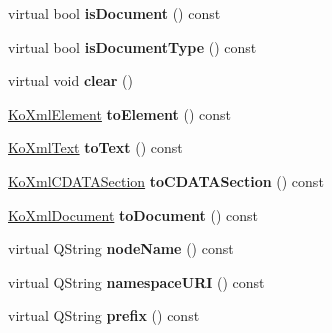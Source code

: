 \begin{CompactItemize}
\item 
\hypertarget{classKoXmlNode_72089a94f37917bdc8896368c83c75dd}{
virtual bool \textbf{isDocument} () const }
\label{classKoXmlNode_72089a94f37917bdc8896368c83c75dd}

\item 
\hypertarget{classKoXmlNode_c959bde05fba69bc9593e45e8862e7fd}{
virtual bool \textbf{isDocumentType} () const }
\label{classKoXmlNode_c959bde05fba69bc9593e45e8862e7fd}

\item 
\hypertarget{classKoXmlNode_514c6e4cca00c3cdd15b49b7256ccdca}{
virtual void \textbf{clear} ()}
\label{classKoXmlNode_514c6e4cca00c3cdd15b49b7256ccdca}

\item 
\hypertarget{classKoXmlNode_f4ecc91ee34dc96cce56baf014f33618}{
\hyperlink{classKoXmlElement}{KoXmlElement} \textbf{toElement} () const }
\label{classKoXmlNode_f4ecc91ee34dc96cce56baf014f33618}

\item 
\hypertarget{classKoXmlNode_0a59d93ef6d9470fd45eb4b9e9c36ef1}{
\hyperlink{classKoXmlText}{KoXmlText} \textbf{toText} () const }
\label{classKoXmlNode_0a59d93ef6d9470fd45eb4b9e9c36ef1}

\item 
\hypertarget{classKoXmlNode_b78d1e67e9ebda2ea669e66d28e855d9}{
\hyperlink{classKoXmlCDATASection}{KoXmlCDATASection} \textbf{toCDATASection} () const }
\label{classKoXmlNode_b78d1e67e9ebda2ea669e66d28e855d9}

\item 
\hypertarget{classKoXmlNode_a0abff287194be42fb8a481c00c0e9e6}{
\hyperlink{classKoXmlDocument}{KoXmlDocument} \textbf{toDocument} () const }
\label{classKoXmlNode_a0abff287194be42fb8a481c00c0e9e6}

\item 
\hypertarget{classKoXmlNode_a20285fa94dca94fddc354564d0c88be}{
virtual QString \textbf{nodeName} () const }
\label{classKoXmlNode_a20285fa94dca94fddc354564d0c88be}

\item 
\hypertarget{classKoXmlNode_cb26ec1c77974dfa349e56f371ec21c5}{
virtual QString \textbf{namespaceURI} () const }
\label{classKoXmlNode_cb26ec1c77974dfa349e56f371ec21c5}

\item 
\hypertarget{classKoXmlNode_204cfe128f5b60d2f138e1733f457402}{
virtual QString \textbf{prefix} () const }
\label{classKoXmlNode_204cfe128f5b60d2f138e1733f457402}


\end{CompactItemize}
